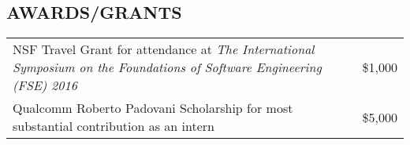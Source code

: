 \documentclass[10pt, letterpaper]{article}
\begin{document}
\smallskip
{\centering \subsection*{AWARDS/GRANTS} \par}
\begin{tabularx}{\textwidth}{X r}
NSF Travel Grant for attendance at \textit{The International Symposium on the
  Foundations of Software Engineering (FSE) 2016} & \$1,000
\\
  Qualcomm Roberto Padovani Scholarship for most substantial contribution as an intern & \$5,000
\end{tabularx}
\smallskip
\end{document}
